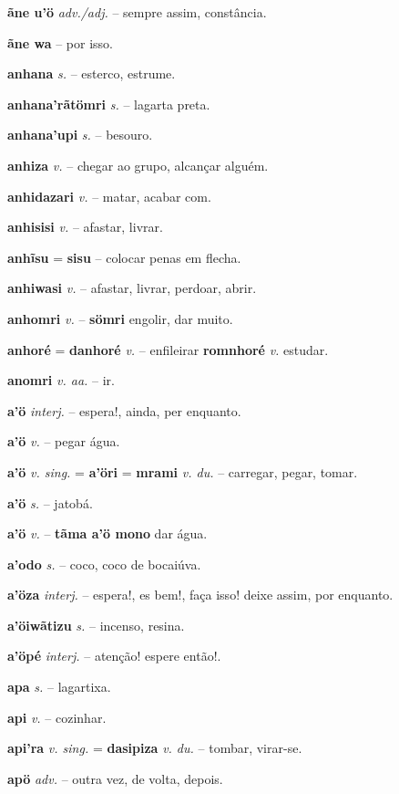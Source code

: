\textbf{ãne u'ö} \textit{adv./adj.} -- sempre assim, constância.

\textbf{ãne wa} -- por isso.

\textbf{anhana} \textit{s.} -- esterco, estrume.

\textbf{anhana'rãtömri} \textit{s.} -- lagarta preta.

\textbf{anhana'upi} \textit{s.} -- besouro.

\textbf{anhiza} \textit{v.} -- chegar ao grupo, alcançar alguém.

\textbf{anhidazari} \textit{v.} -- matar, acabar com.

\textbf{anhisisi} \textit{v.} -- afastar, livrar.

\textbf{anhĩsu} = \textbf{sisu} -- colocar penas em flecha.

\textbf{anhiwasi} \textit{v.} -- afastar, livrar, perdoar, abrir.

\textbf{anhomri} \textit{v.} -- \textbf{sömri} engolir, dar muito.

\textbf{anhoré} = \textbf{danhoré} \textit{v.} -- enfileirar  \textbf{romnhoré} \textit{v.} estudar.

\textbf{anomri} \textit{v. aa.} -- ir.

\textbf{a'ö} \textit{interj.} -- espera!, ainda, per enquanto.

\textbf{a'ö} \textit{v.} -- pegar água.

\textbf{a'ö} \textit{v. sing.} = \textbf{a'öri} = \textbf{mrami} \textit{v. du.} -- carregar, pegar, tomar.

\textbf{a'ö} \textit{s.} -- jatobá.

\textbf{a'ö} \textit{v.} -- \textbf{tãma a'ö mono} dar água.

\textbf{a'odo} \textit{s.} -- coco, coco de bocaiúva.

\textbf{a'öza} \textit{interj.} -- espera!, es bem!, faça isso! deixe assim, por enquanto.

\textbf{a'öiwãtizu} \textit{s.} -- incenso, resina.

\textbf{a'öpé} \textit{interj.} -- atenção! espere então!.

\textbf{apa} \textit{s.} -- lagartixa.

\textbf{api} \textit{v.} -- cozinhar.

\textbf{api'ra} \textit{v. sing.} = \textbf{dasipiza} \textit{v. du.} -- tombar, virar-se.

\textbf{apö} \textit{adv.} -- outra vez, de volta, depois.


